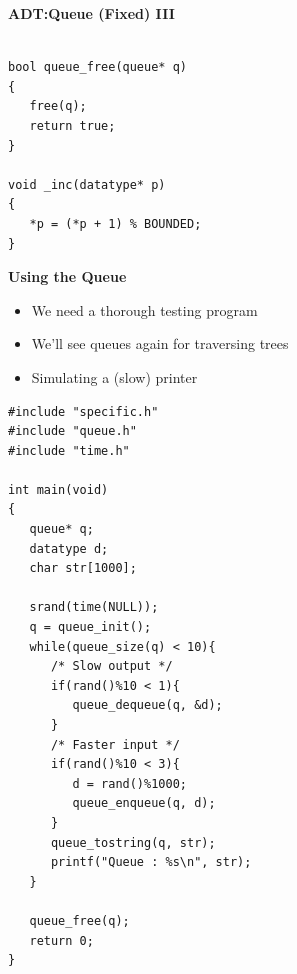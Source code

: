 \documentclass[a4,portraitt]{slides}
\begin{document}
\newpage
{\samepage
\begin{center}
{\Large{\bf ADT:Queue (Fixed) III}}
\end{center}
{\small
\begin{verbatim}

bool queue_free(queue* q)
{
   free(q);
   return true;
}

void _inc(datatype* p)
{
   *p = (*p + 1) % BOUNDED;
}
\end{verbatim}


\begin{center}
\end{center}
} }

\newpage
{\samepage
\begin{center}
{\Large{\bf Using the Queue}}
\end{center}
{\small
\begin{itemize}
\item We need a thorough testing program
\item We'll see queues again for traversing trees
\item Simulating a (slow) printer
\end{itemize}
\begin{verbatim}
#include "specific.h"
#include "queue.h"
#include "time.h"

int main(void)
{
   queue* q;
   datatype d;
   char str[1000];

   srand(time(NULL));
   q = queue_init();
   while(queue_size(q) < 10){
      /* Slow output */
      if(rand()%10 < 1){
         queue_dequeue(q, &d);
      }
      /* Faster input */
      if(rand()%10 < 3){
         d = rand()%1000;
         queue_enqueue(q, d);
      }
      queue_tostring(q, str);
      printf("Queue : %s\n", str);
   }

   queue_free(q);
   return 0;
}
\end{verbatim}
} }
\end{document}
